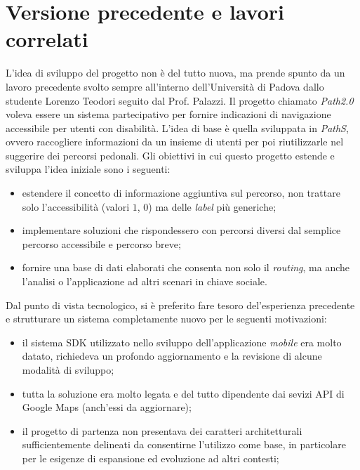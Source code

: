 \section{Versione precedente e lavori correlati}
L'idea di sviluppo del progetto non è del tutto nuova, ma prende spunto da un lavoro precedente svolto sempre all'interno dell'Università di Padova dallo studente Lorenzo Teodori seguito dal Prof. Palazzi. Il progetto chiamato \emph{Path2.0} voleva essere un sistema partecipativo per fornire indicazioni di navigazione accessibile per utenti con disabilità. L'idea di base è quella sviluppata in \emph{PathS}, ovvero raccogliere informazioni da un insieme di utenti per poi riutilizzarle nel suggerire dei percorsi pedonali. Gli obiettivi in cui questo progetto estende e sviluppa l'idea iniziale sono i seguenti:
\begin{itemize}
\item estendere il concetto di informazione aggiuntiva sul percorso, non trattare solo l'accessibilità (valori $1$, $0$) ma delle \emph{label} più generiche;
\item implementare soluzioni che rispondessero con percorsi diversi dal semplice percorso accessibile e percorso breve;
\item fornire una base di dati elaborati che consenta non solo il \emph{routing}, ma anche l'analisi o l'applicazione ad altri scenari in chiave sociale.
\end{itemize}
Dal punto di vista tecnologico, si è preferito fare tesoro del'esperienza precedente e strutturare un sistema completamente nuovo per le seguenti motivazioni:
\begin{itemize}
\item il sistema SDK utilizzato nello sviluppo dell'applicazione \emph{mobile} era molto datato, richiedeva un profondo aggiornamento e la revisione di alcune modalità di sviluppo;
\item tutta la soluzione era molto legata e del tutto dipendente dai sevizi API di Google Maps (anch'essi da aggiornare);
\item il progetto di partenza non presentava dei caratteri architetturali sufficientemente delineati da consentirne l'utilizzo come base, in particolare per le esigenze di espansione ed evoluzione ad altri contesti;
\end{itemize}

